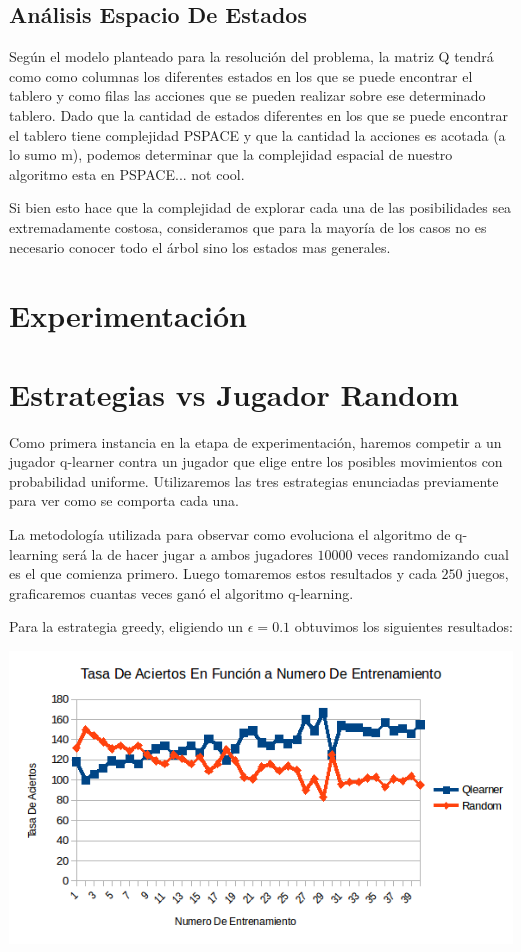 \subsection{Análisis Espacio De Estados}

Según el modelo planteado para la resolución del problema, la matriz Q tendrá como como columnas los diferentes estados en los que se puede encontrar el tablero y como filas las acciones que se pueden realizar sobre ese determinado tablero. Dado que la cantidad de estados diferentes en los que se puede encontrar el tablero tiene complejidad PSPACE y que la cantidad la acciones es acotada (a lo sumo m), podemos determinar que la complejidad espacial de nuestro algoritmo esta en PSPACE... not cool.

Si bien esto hace que la complejidad de explorar cada una de las posibilidades sea extremadamente costosa, consideramos que para la mayoría de los casos no es necesario conocer todo el árbol sino los estados mas generales.



\pagebreak
\section{Experimentación}

\section{Estrategias vs Jugador Random}

Como primera instancia en la etapa de experimentación, haremos competir a un jugador q-learner contra un jugador que elige entre los posibles movimientos con probabilidad uniforme. Utilizaremos las tres estrategias enunciadas previamente para ver como se comporta cada una. 

La metodología utilizada para observar como evoluciona el algoritmo de q-learning será la de hacer jugar a ambos jugadores $10000$ veces randomizando cual es el que comienza primero. Luego tomaremos estos resultados y cada $250$ juegos, graficaremos cuantas veces ganó el algoritmo q-learning. 

Para la estrategia greedy, eligiendo un $\epsilon=0.1$ obtuvimos los siguientes resultados:

\includegraphics[scale=0.5]{testing/greedy.png}

